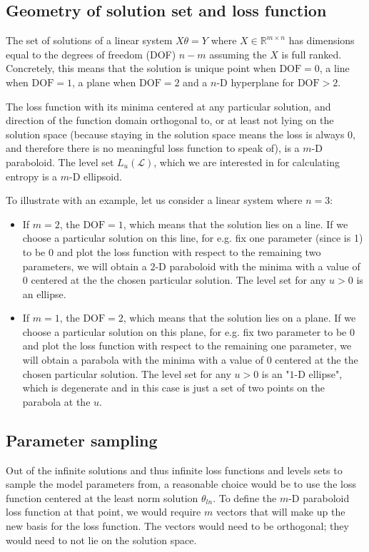 \documentclass{article}
\begin{document}
\subsection{Geometry of solution set and loss function}
The set of solutions of a linear system $X\theta = Y$ where $X \in \mathbb{R}^{m \times n}$ has dimensions equal to the degrees of freedom (DOF) $n-m$ assuming the $X$ is full ranked. Concretely, this means that the solution is unique point when $\text{DOF}=0$, a line when $\text{DOF}=1$, a plane when $\text{DOF}=2$ and a $n$-D hyperplane for $\text{DOF} > 2$.

The loss function with its minima centered at any particular solution, and direction of the function domain orthogonal to, or at least not lying on the solution space (because staying in the solution space means the loss is always 0, and therefore there is no meaningful loss function to speak of), is a $m$-D paraboloid. The level set $L_u(\mathcal{L})$, which we are interested in for calculating entropy is a $m$-D ellipsoid. 

To illustrate with an example, let us consider a linear system where $n=3$:
\begin{itemize}
\item If $m=2$, the $\text{DOF}=1$, which means that the solution lies on a line. If we choose a particular solution on this line, for e.g. fix one parameter (since  is 1) to be $0$ and plot the loss function with respect to the remaining two parameters, we will obtain a $2$-D paraboloid with the minima with a value of $0$ centered at the the chosen particular solution. The level set for any $u > 0$ is an ellipse. 

\item If $m=1$, the $\text{DOF}=2$, which means that the solution lies on a plane. If we choose a particular solution on this plane, for e.g. fix two parameter to be $0$ and plot the loss function with respect to the remaining one parameter, we will obtain a parabola with the minima with a value of $0$ centered at the the chosen particular solution. The level set for any $u > 0$ is an "$1$-D ellipse", which is degenerate and in this case is just a set of two points on the parabola at the $u$.
\end{itemize}

\subsection{Parameter sampling}
Out of the infinite solutions and thus infinite loss functions and levels sets to sample the model parameters from, a reasonable choice would be to use the loss function centered at the least norm solution $\theta_{ln}$. To define the $m$-D paraboloid loss function at that point, we would require $m$ vectors that will make up the new basis for the loss function. The vectors would need to be orthogonal; they would need to not lie on the solution space. 
\end{document}
